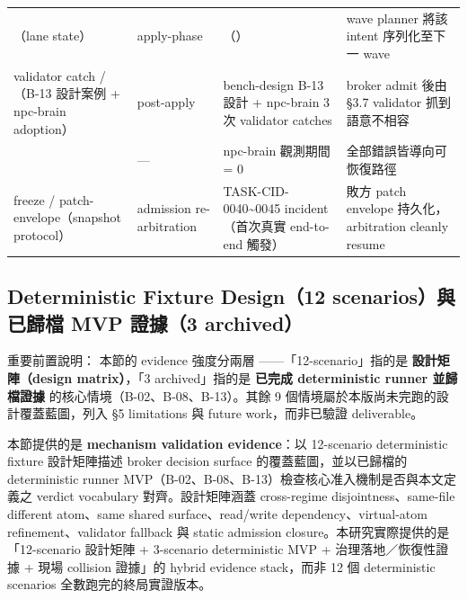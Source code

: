 \documentclass[a4paper,fontset=none]{ctexart}
\begin{document}
\begin{longtable}{L{0.23\textwidth}L{0.23\textwidth}L{0.23\textwidth}L{0.23\textwidth}}
\texttt{}（lane state） & apply-phase & \texttt{}（\texttt{}） & wave planner 將該 intent 序列化至下一 wave \\
validator catch / \texttt{}（B-13 設計案例 + npc-brain adoption） & post-apply & bench-design B-13 設計 + npc-brain 3 次 validator catches & broker admit 後由 §3.7 validator 抓到語意不相容 \\
\texttt{} & --- & npc-brain 觀測期間 = 0 & 全部錯誤皆導向可恢復路徑 \\
freeze / patch-envelope（snapshot protocol） & admission re-arbitration & TASK-CID-0040\textasciitilde{}0045 incident（首次真實 end-to-end 觸發） & 敗方 patch envelope 持久化，arbitration cleanly resume \\
\bottomrule
\end{longtable}
\endgroup

\subsection{Deterministic Fixture Design（12 scenarios）與已歸檔 MVP 證據（3 archived）}

重要前置說明： 本節的 evidence 強度分兩層 ------「12-scenario」指的是 \textbf{設計矩陣（design matrix）}，「3 archived」指的是 \textbf{已完成 deterministic runner 並歸檔證據} 的核心情境（B-02、B-08、B-13）。其餘 9 個情境屬於本版尚未完跑的設計覆蓋藍圖，列入 §5 limitations 與 future work，而非已驗證 deliverable。

本節提供的是 \textbf{mechanism validation evidence}：以 12-scenario deterministic fixture 設計矩陣描述 broker decision surface 的覆蓋藍圖，並以已歸檔的 deterministic runner MVP（B-02、B-08、B-13）檢查核心准入機制是否與本文定義之 verdict vocabulary 對齊。設計矩陣涵蓋 cross-regime disjointness、same-file different atom、same shared surface、read/write dependency、virtual-atom refinement、validator fallback 與 static admission closure。本研究實際提供的是「12-scenario 設計矩陣 + 3-scenario deterministic MVP + 治理落地／恢復性證據 + 現場 collision 證據」的 hybrid evidence stack，而非 12 個 deterministic scenarios 全數跑完的終局實證版本。

\smallskip{}\par\smallskip
\end{document}
